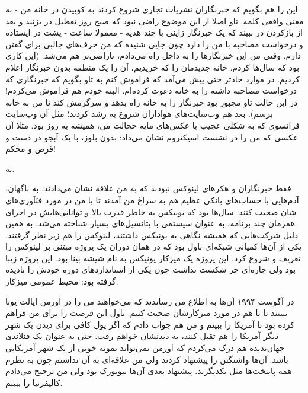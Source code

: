این را هم بگویم که خبرنگاران نشریات تجاری شروع کردند به کوبیدن در خانه
من - به معنی واقعی کلمه. تاو اصلا از این موضوع راضی نبود که صبح روز
تعطیل در بزنند و بعد از بازکردن در ببیند که یک خبرنگار ژاپنی با چند
هدیه - معمولا ساعت - پشت در ایستاده و درخواست مصاحبه با من را دارد چون
جایی شنیده که من حرف‌های جالبی برای گفتن دارم. وقتی من این خبرنگارها را
به داخل راه می‌دادم، ناراضی‌تر هم می‌شد. (این کاری بود که سال‌ها
کردم. خانه جدیدمان را که خریدیم، آن را یک منطقه بدون خبرنگار اعلام
کردیم. در موارد حادتر حتی پیش می‌آمد که فراموش کنم به تاو بگویم که
خبرنگاری که درخواست مصاحبه داشته را به خانه دعوت کرده‌ام. البته خودم هم
فراموش می‌کردم! در این حالت تاو مجبور بود خبرنگار را به خانه راه بدهد و
سرگرمش کند تا من به خانه برسم). بعد هم وب‌سایت‌های هواداران شروع به رشد
کردند؛ مثل آن وب‌سایت فرانسوی که به شکلی عجیب با عکس‌های مایه خجالت من،
همیشه به روز بود. مثلا آن عکسی که من را در نشست اسپکتروم نشان می‌داد:
بدون بلوز، با یک آبجو در دست و قرص و محکم!

نه.

فقط خبرنگاران و هکرهای لینوکس نبودند که به من علاقه نشان می‌دادند. به
ناگهان، آدم‌هایی با حساب‌های بانکی عظیم هم به سراغ من آمدند تا با من در
مورد فنّآوری‌های شان صحبت کنند. سال‌ها بود که یونیکس به خاطر قدرت بالا و
توانایی‌هایش در اجرای همزمان چند برنامه، به عنوان سیستمی با پتانسیل‌های
بسیار شناخته می‌شد. به همین دلیل شرکت‌هایی که همیشه نگاهی به یونیکس
داشتند، لینوکس را هم زیر نظر گرفتند. یکی از آن‌ها کمپانی شبکه‌ای
ناول بود که در همان دوران یک پروژه مبتنی بر لینوکس
را تعریف و شروع کرد. این پروژه یک میزکار یونیکس به نام شیشه
بینا بود. این پروژه زیبا بود ولی چاره‌ای جز
شکست نداشت چون یکی از استانداردهای دوره خودش را نادیده گرفته بود: محیط
عمومی میزکار.



در آگوست ۱۹۹۴ ‌آن‌ها به اطلاع من رساندند که می‌خواهند من را در اورمن
ایالت یوتا ببینند تا با هم در مورد میزکارشان
صحبت کنیم. ناول این فرصت را برای من فراهم کرده بود تا آمریکا را ببینم
و من هم جواب دادم که اگر پول کافی برای دیدن یک شهر دیگر آمریکا را هم
تقبل کنند، به دیدنشان خواهم رفت. حتی به عنوان یک فنلاندی جهان‌ندیده هم
درک می‌کردم که اورمن نمی‌تواند نمونه خوبی از یک شهر آمریکایی باشد. آن‌ها
واشنگتن را پیشنهاد کردند ولی من علاقه‌ای به آن نداشتم چون به نظرم همه
پایتخت‌ها مثل یکدیگرند. پیشنهاد بعدی آن‌ها نیویورک بود ولی من ترجیح
می‌دادم کالیفرنیا را ببینم.

